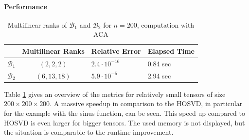 \documentclass[%
a4paper,
parskip=half,
DIV=calc,
]
{scrartcl}
\begin{document}
\paragraph{Performance}
\begin{table}[h]
  \centering
  \begin{tabular}[]{ccll}
    & Multilinear Ranks & Relative Error &  Elapsed Time\\ \hline
    $\mathcal{B}_1$ & $(2,2,2)$ & $2.4 \cdot 10^{-16}$  &  0.84 sec\\
    $\mathcal{B}_2$ & $(6,13,18)$ & $5.9 \cdot 10^{- 5}$  &  2.94 sec\\
  \end{tabular}
  \caption{Multilinear ranks of $\mathcal{B}_1$ and $\mathcal{B}_2$ for $n=200$, computation with ACA}
  \label{tab:acark}
\end{table}
Table \ref{tab:acark} gives an overview of the metrics for relatively
small tensors of size $200 \times 200 \times 200$.  A massive speedup
in comparison to the HOSVD, in particular for the example with the sinus
function, can be seen.  This speed up compared to HOSVD is even larger
for bigger tensors.  The used memory is not displayed, but the
situation is comparable to the runtime improvement.
\end{document}
